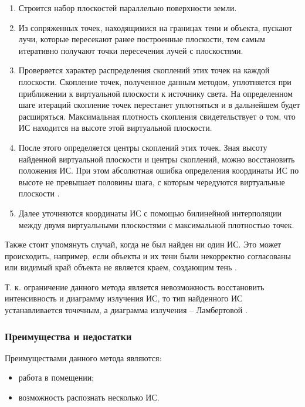 \begin{enumerate}
	\item Строится набор плоскостей параллельно поверхности земли.
	\item Из сопряженных точек, находящимися на границах тени и объекта, пускают лучи, которые пересекают ранее построенные плоскости, тем самым итеративно получают точки пересечения лучей с плоскостями.
	\item Проверяется характер распределения скоплений этих точек на каждой плоскости. Скопление точек, полученное данным методом, уплотняется при приближении к виртуальной плоскости к источнику света. На определенном шаге итераций скопление точек перестанет уплотняться и в дальнейшем будет расширяться. Максимальная плотность скопления свидетельствует о том, что ИС находится на высоте этой виртуальной плоскости.
	\item После этого определяется центры скоплений этих точек. Зная высоту найденной виртуальной плоскости и центры скоплений, можно восстановить положения ИС.	При этом абсолютная ошибка определения координаты ИС по высоте не превышает половины шага, с которым чередуются виртуальные плоскости  \cite{shadow_contours_method}.
	\item Далее уточняются координаты ИС с помощью билинейной интерполяции между двумя виртуальными плоскостями с максимальной плотностью точек.
\end{enumerate}

Также стоит упомянуть случай, когда не был найден ни один ИС. Это может происходить, например, если объекты и их тени были некорректно согласованы или видимый край объекта не является краем, создающим тень \cite{shadow_contours_method}.

Т. к. ограничение данного метода является невозможность восстановить интенсивность и диаграмму излучения ИС, то тип найденного ИС устанавливается точечным, а диаграмма излучения -- Ламбертовой \cite{shadow_contours_method}.

\subsubsection*{Преимущества и недостатки}

Преимуществами данного метода являются:

\begin{itemize}
	\item работа в помещении;
	\item возможность распознать несколько ИС. 
\end{itemize}

